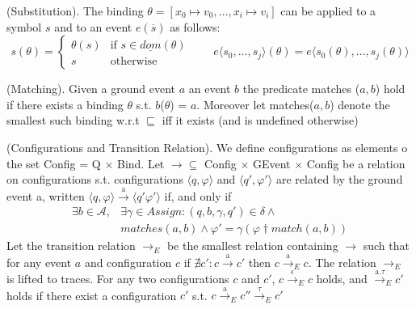 				\begin{dfn}
					(Substitution).
					The binding $\theta = [x_0 \mapsto v_0, \dots, x_i \mapsto v_i]$ can be applied to a symbol $s$ and to an event
					$e(\overline{s})$ as follows: 
					\[
					 s(\theta) = 
					  \begin{cases} 
					   \theta(s) & \text{if } s \in \underline{dom}(\theta) \\
					   s & \text{otherwise}
					  \end{cases}
					  \qquad e \langle s_0,\ldots,s_j \rangle (\theta) = e \langle s_0(\theta),\ldots,s_j(\theta) \rangle
					\]
				\end{dfn}
				
				\begin{dfn}
					(Matching).
					Given a ground event $a$ an event $b$ the predicate matches ($a, b$) hold if there exists a binding $\theta$ s.t. $b$($\theta$) = $a$.
					Moreover let matches($a,b$) denote the smallest such binding w.r.t $\sqsubseteq$ iff it exists (and is undefined otherwise)
				\end{dfn}
				
				\begin{dfn}
					(Configurations and Transition Relation).
					We define configurations as elements o the set Config = Q $\times$ Bind. Let $\rightarrow \subseteq$ Config $\times$ GEvent $\times$ Config be a relation on
					configurations s.t. configurations $\langle q, \varphi \rangle$ and $\langle q', \varphi' \rangle$ are related by the ground event a, written
					$\langle q, \varphi \rangle \xrightarrow{\text{a}} \langle q' \varphi' \rangle$ if, and only if
						\begin{align}
							\exists b \in \mathcal{A}, & \exists \gamma \in Assign : (q, b, \gamma, q') \in \delta \wedge \\
							&matches(a,b) \wedge \varphi' = \gamma(\varphi \dagger match(a,b))
						\end{align}
					Let the transition relation $\rightarrow_{E}$ be the smallest relation containing $\rightarrow$ such that for any event
					$a$ and configuration $c$ if $\nexists c' : c \xrightarrow{\text{a}} c'$ then $ c \xrightarrow{\text{a}}_E c$.
					The relation $\rightarrow_E$ is lifted to traces.
					For any two configurations $c$ and $c'$, $ c \xrightarrow{\text{$\epsilon$}}_E c$ holds, and $\xrightarrow{\text{a.$\tau$}}_E c'$ holds
					if there exist a configuration $c'$ s.t. $c \xrightarrow{\text{a}}_E c'' \xrightarrow{\text{$\tau$}}_E c'$
				\end{dfn}
				

